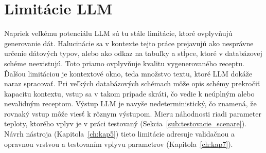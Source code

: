 \section{Limitácie LLM}
\label{sub:limitacie_llm}
Napriek veľkému potenciálu LLM sú tu stále limitácie, ktoré ovplyvňujú generovanie dát. Halucinácie sa v kontexte tejto práce prejavujú ako nesprávne určenie dátových typov, alebo ako odkaz na tabuľky a stĺpce, ktoré v databázovej schéme neexistujú. Toto priamo ovplyvňuje kvalitu vygenerovaného receptu. Ďalšou limitáciou je kontextové okno, teda množstvo textu, ktoré LLM dokáže naraz spracovať. Pri veľkých databázových schémach môže opis schémy prekročiť kapacitu kontextu, vstup sa v takom prípade skráti, čo vedie k neúplným alebo nevalidným receptom. Výstup LLM je navyše nedeterministický, čo znamená, že rovnaký vstup môže viesť k rôznym výstupom. Mieru náhodnosti riadi parameter teploty, ktorého vplyv je v práci testovaný (Sekcia~\ref{sub:testovacie_scenare}). Návrh nástroja (Kapitola~\ref{ch:kap5}) tieto limitácie adresuje validačnou a opravnou vrstvou a testovaním vplyvu parametrov (Kapitola~\ref{ch:kap7}).  
